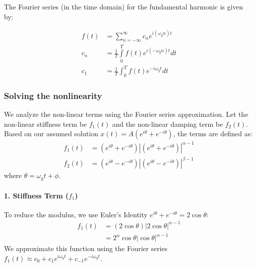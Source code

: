 \documentclass[10pt,twoside]{report}
\begin{document}
The Fourier series (in the time domain) for the fundamental harmonic is given by:

\begin{align*}
    f(t) & = \sum\limits_{n=- \infty}^{\infty} c_n e^{i(\omega_g n)t} \\
    c_n  & = \frac{1}{T}\int\limits_{0}^{T} f(t)e^{i(-\omega_g n)t} dt \\
    c_1 &= \frac{1}{T} \int_{0}^{T} f(t) e^{-i\omega_g t} dt
\end{align*}

\subsubsection{Solving the nonlinearity}

We analyze the non-linear terms using the Fourier series approximation. Let the non-linear stiffness term be $f_1(t)$ and the non-linear damping term be $f_2(t)$. 
Based on our assumed solution $x(t) = A(e^{i\theta} + e^{-i\theta})$, the terms are defined as:
\begin{align*}
    f_1(t) &= (e^{i\theta} + e^{-i\theta}) \left| (e^{i\theta} + e^{-i\theta}) \right|^{\alpha-1} \\
    f_2(t) &= (e^{i\theta} - e^{-i\theta}) \left| (e^{i\theta} - e^{-i\theta}) \right|^{\beta-1}
\end{align*}
where $\theta = \omega_g t + \phi$.

\paragraph{1. Stiffness Term ($f_1$)}
To reduce the modulus, we use Euler's Identity $e^{i\theta} + e^{-i\theta} = 2\cos\theta$:
\begin{align*}  
    f_1(t) &= (2\cos\theta) \left| 2\cos\theta \right|^{\alpha-1} \\
           &= 2^\alpha \cos\theta |\cos\theta|^{\alpha-1}
\end{align*}
We approximate this function using the Fourier series $f_1(t) \approx c_0 + c_1 e^{i\omega_g t} + c_{-1} e^{-i\omega_g t}$.
\end{document}
